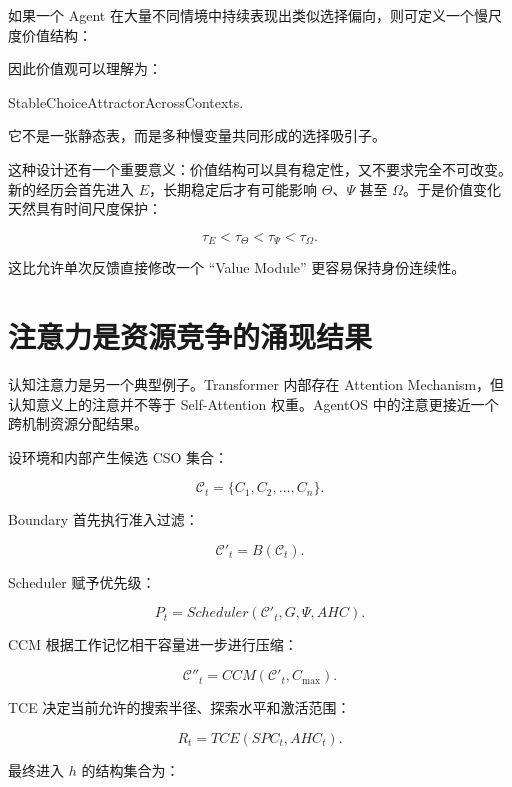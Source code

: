 如果一个 Agent 在大量不同情境中持续表现出类似选择偏向，则可定义一个慢尺度价值结构：

\begin{statementbox}
\centering
{}
\end{statementbox}

因此价值观可以理解为：

\begin{statementbox}
StableChoiceAttractorAcrossContexts.
\end{statementbox}

它不是一张静态表，而是多种慢变量共同形成的选择吸引子。

这种设计还有一个重要意义：价值结构可以具有稳定性，又不要求完全不可改变。新的经历会首先进入 $E$，长期稳定后才有可能影响 $\Theta$、$\Psi$ 甚至 $\Omega$。于是价值变化天然具有时间尺度保护：

\[
\tau_E
<
\tau_\Theta
<
\tau_\Psi
<
\tau_\Omega.
\]

这比允许单次反馈直接修改一个 ``Value Module'' 更容易保持身份连续性。

\section{注意力是资源竞争的涌现结果}

认知注意力是另一个典型例子。Transformer 内部存在 Attention Mechanism，但认知意义上的注意并不等于 Self-Attention 权重。AgentOS 中的注意更接近一个跨机制资源分配结果。

设环境和内部产生候选 CSO 集合：

\[
\mathcal C_t
=
\{C_1,C_2,\ldots,C_n\}.
\]

Boundary 首先执行准入过滤：

\[
\mathcal C'_t
=
B(\mathcal C_t).
\]

Scheduler 赋予优先级：

\[
P_t
=
Scheduler(
\mathcal C'_t,
G,
\Psi,
AHC
).
\]

CCM 根据工作记忆相干容量进一步进行压缩：

\[
\mathcal C''_t
=
CCM(
\mathcal C'_t,
C_{\max}
).
\]

TCE 决定当前允许的搜索半径、探索水平和激活范围：

\[
R_t
=
TCE(
SPC_t,
AHC_t
).
\]

最终进入 $h$ 的结构集合为：

\begin{statementbox}
\centering
{}
\end{statementbox}

